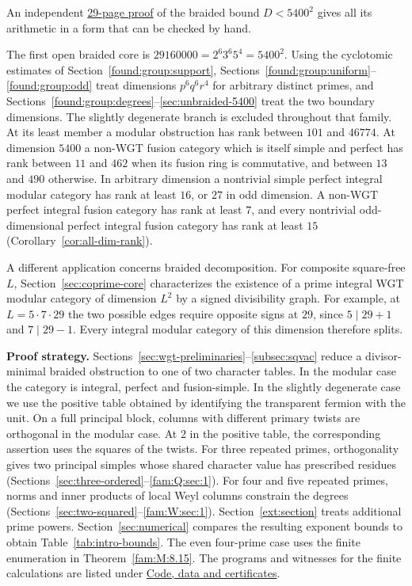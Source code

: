 \documentclass[11pt,a4paper]{article}
\numberwithin{equation}{section}
\theoremstyle{remark}
\begin{document}
An independent \href{https://github.com/sebastienpalcoux/WGT-fusion-categories/blob/main/papers/Below_5400_squared.pdf}{29-page proof} of the braided bound $D<5400^2$ gives all its arithmetic in a form that can be checked by hand.

The first open braided core is $29160000=2^6 3^6 5^4=5400^2$. Using the cyclotomic estimates of Section~\ref{found:group:support}, Sections~\ref{found:group:uniform}--\ref{found:group:odd} treat dimensions $p^6q^6r^4$ for arbitrary distinct primes, and Sections~\ref{found:group:degrees}--\ref{sec:unbraided-5400} treat the two boundary dimensions. The slightly degenerate branch is excluded throughout that family. At its least member a modular obstruction has rank between $101$ and $46774$. At dimension $5400$ a non-WGT fusion category which is itself simple and perfect has rank between $11$ and $462$ when its fusion ring is commutative, and between $13$ and $490$ otherwise. In arbitrary dimension a nontrivial simple perfect integral modular category has rank at least $16$, or $27$ in odd dimension. A non-WGT perfect integral fusion category has rank at least $7$, and every nontrivial odd-dimensional perfect integral fusion category has rank at least $15$ (Corollary~\ref{cor:all-dim-rank}).

A different application concerns braided decomposition. For composite square-free $L$, Section~\ref{sec:coprime-core} characterizes the existence of a prime integral WGT modular category of dimension $L^2$ by a signed divisibility graph. For example, at $L=5\cdot7\cdot29$ the two possible edges require opposite signs at $29$, since $5\mid29+1$ and $7\mid29-1$. Every integral modular category of this dimension therefore splits.

\medskip\noindent\textbf{Proof strategy.}
Sections~\ref{sec:wgt-preliminaries}--\ref{subsec:sqvac} reduce a divisor-minimal braided obstruction to one of two character tables. In the modular case the category is integral, perfect and fusion-simple. In the slightly degenerate case we use the positive table obtained by identifying the transparent fermion with the unit. On a full principal block, columns with different primary twists are orthogonal in the modular case. At $2$ in the positive table, the corresponding assertion uses the squares of the twists. For three repeated primes, orthogonality gives two principal simples whose shared character value has prescribed residues (Sections~\ref{sec:three-ordered}--\ref{fam:Q:sec:1}). For four and five repeated primes, norms and inner products of local Weyl columns constrain the degrees (Sections~\ref{sec:two-squared}--\ref{fam:W:sec:1}). Section~\ref{ext:section} treats additional prime powers. Section~\ref{sec:numerical} compares the resulting exponent bounds to obtain Table~\ref{tab:intro-bounds}. The even four-prime case uses the finite enumeration in Theorem~\ref{fam:M:8.15}. The programs and witnesses for the finite calculations are listed under \hyperref[sec:code-data-certificates]{Code, data and certificates}.
\end{document}
